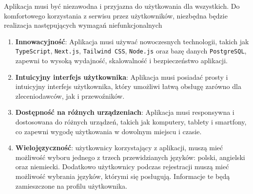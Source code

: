 Aplikacja musi być niezawodna i przyjazna do użytkowania dla wszystkich. Do komfortowego korzystania z serwisu przez użytkowników, niezbędna będzie realizacja następujących wymagań niefunkcjonalnych
\begin{enumerate}
    \item \textbf{Innowacyjność}: Aplikacja musi używać nowoczesnych technologii, takich jak \texttt{TypeScript}, \texttt{Next.js}, \texttt{Tailwind CSS}, \texttt{Node.js} oraz bazę danych \texttt{PostgreSQL}, zapewni to wysoką wydajność, skalowalność i bezpieczeństwo aplikacji.
    \item \textbf{Intuicyjny interfejs użytkownika}: Aplikacja musi posiadać prosty i intuicyjny interfejs użytkownika, który umożliwi łatwą obsługę zarówno dla zleceniodawców, jak i przewoźników.
    \item \textbf{Dostępność na różnych urządzeniach}: Aplikacja musi responsywna i dostosowana do różnych urządzeń, takich jak komputery, tablety i smartfony, co zapewni wygodę użytkowania w dowolnym miejscu i czasie.
    \item \textbf{Wielojęzyczność}: użytkownicy korzystający z aplikacji, muszą mieć możliwość wyboru jednego z trzech przewidzianych języków: polski, angielski oraz niemiecki. Dodatkowo użytkownicy podczas rejestracji muszą mieć możliwość wybrania języków, którymi się posługują. Informacje te będą zamieszczone na profilu użytkownika.
\end{enumerate}
